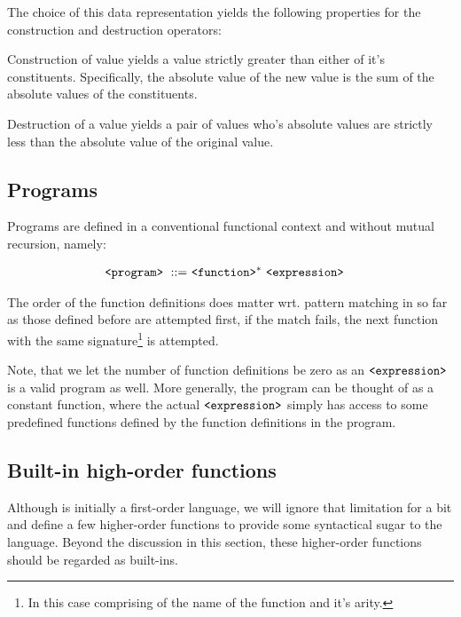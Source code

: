 The choice of this data representation yields the following properties for the
construction and destruction operators:

\begin{lemma} Construction of value yields a value strictly greater than either
of it's constituents. Specifically, the absolute value of the new value is the
sum of the absolute values of the constituents.\end{lemma}

\begin{lemma} Destruction of a value yields a pair of values who's absolute
values are strictly less than the absolute value of the original
value.\end{lemma}

\subsection{Programs}

Programs are defined in a conventional functional context and without mutual
recursion, namely:

\begin{align}
\text{{\ttfamily<program>}}\ ::=&\ \text{{\ttfamily<function>}}^*\ \text{{\ttfamily<expression>}}
\end{align}

The order of the function definitions does matter wrt. pattern matching in so
far as those defined before are attempted first, if the match fails, the next
function with the same signature\footnote{In this case comprising of the name
of the function and it's arity.} is attempted.

Note, that we let the number of function definitions be zero as an
$\text{{\ttfamily<expression>}}$ is a valid program as well. More generally, the program
can be thought of as a constant function, where the actual
$\text{{\ttfamily<expression>}}$ simply has access to some predefined functions defined
by the function definitions in the program.

\subsection{Built-in high-order
functions}\label{section:language-higher-order-built-ins}

Although  is initially a first-order language, we will ignore that
limitation for a bit and define a few higher-order functions to provide some
syntactical sugar to the language. Beyond the discussion in this section, these
higher-order functions should be regarded as  built-ins.

